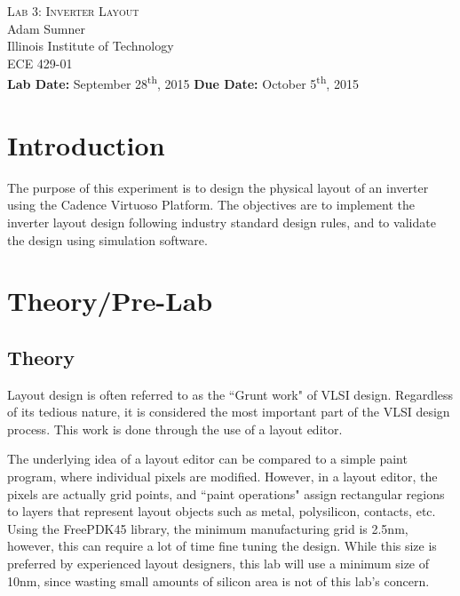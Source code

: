 \documentclass[12pt]{article}
\begin{document}
\begin{titlepage}
	\begin{center}
		
		
		\vfill
		
		\textsc{\LARGE Lab 3: Inverter Layout}\\[1.5cm]
		
		\Large Adam Sumner\\[0.5cm]
		
		\Large Illinois Institute of Technology\\[0.5cm]
		
		\Large ECE 429-01\\[0.5cm]	
		
		\noindent
		\vfill
		\large \textbf{Lab Date:} September 28\textsuperscript{th}, 2015\hfill
		\large \textbf{Due Date:} October 5\textsuperscript{th}, 2015
	
		
	\end{center}
\end{titlepage}

\section{Introduction}
The purpose of this experiment is to design the physical layout of an inverter using the Cadence Virtuoso Platform. The objectives are to implement the inverter layout design following industry standard design rules, and to validate the design using simulation software.
\section{Theory/Pre-Lab}
\subsection{Theory}
Layout design is often referred to as the ``Grunt work" of VLSI design. Regardless of its tedious nature, it is considered the most important part of the VLSI design process. This work is done through the use of a layout editor.

The underlying idea of a layout editor can be compared to a simple paint program, where individual pixels are modified. However, in a layout editor, the pixels are actually grid points, and ``paint operations" assign rectangular regions to layers that represent layout objects such as metal, polysilicon, contacts, etc. Using the FreePDK45 library, the minimum manufacturing grid is 2.5nm, however, this can require a lot of time fine tuning the design. While this size is preferred by experienced layout designers, this lab will use a minimum size of 10nm, since wasting small amounts of silicon area is not of this lab's concern. 
\end{document}
